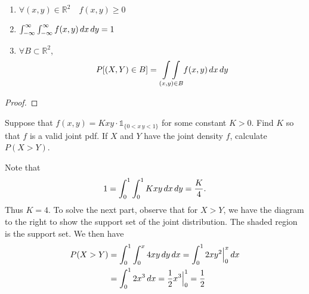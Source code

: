 \documentclass[notoc,notitlepage]{tufte-book}
\begin{document}
\begin{propo}
\label{propo:properties_of_joint_pdf}
  \begin{enumerate}
    \item $\forall (x, y) \in \mathbb{R}^2 \quad f(x, y) \geq 0$
    \item $\int_{-\infty}^{\infty} \int_{-\infty}^{\infty} f(x, y) \mathop{}\!d{x} \mathop{}\!d{y} = 1$
    \item $\forall B \subset \mathbb{R}^2$,
      \begin{equation*}
        P[ (X, Y) \in B ] = \underset{(x, y) \in B}{\int \int} f(x, y) \mathop{}\!d{x} \mathop{}\!d{y} 
      \end{equation*}
  \end{enumerate}
\end{propo}

\begin{proof}
  
\end{proof}

\begin{eg}[Example 3.9]
  Suppose that $f(x, y) = Kxy \cdot \mathbb{1}_{\{0 < x \, y < 1 \}}$ for some constant $K > 0$. Find $K$ so that $f$ is a valid joint pdf. If $X$ and $Y$ have the joint density $f$, calculate $P(X > Y)$.

  \begin{solution}
    Note that
    \begin{equation*}
      1 = \int_{0}^{1} \int_{0}^{1} Kxy \mathop{}\!d{x} \mathop{}\!d{y} = \frac{K}{4}.
    \end{equation*}
    Thus $K = 4$. To solve the next part, observe that for $X > Y$, we have the diagram to the right to show the support set of the joint distribution. 
    The shaded region is the support set. We then have
    \begin{align*}
      P(X > Y) &= \int_{0}^{1} \int_{0}^{x} 4xy \mathop{}\!d{y} \mathop{}\!d{x} = \int_{0}^{1} 2xy^2 \Big|_{0}^{x} \mathop{}\!d{x} \\
        &= \int_{0}^{1} 2x^3 \mathop{}\!d{x} = \frac{1}{2} x^3 \Big|_{0}^{1} = \frac{1}{2}
    \end{align*}
  \end{solution}
\end{eg}
\end{document}
